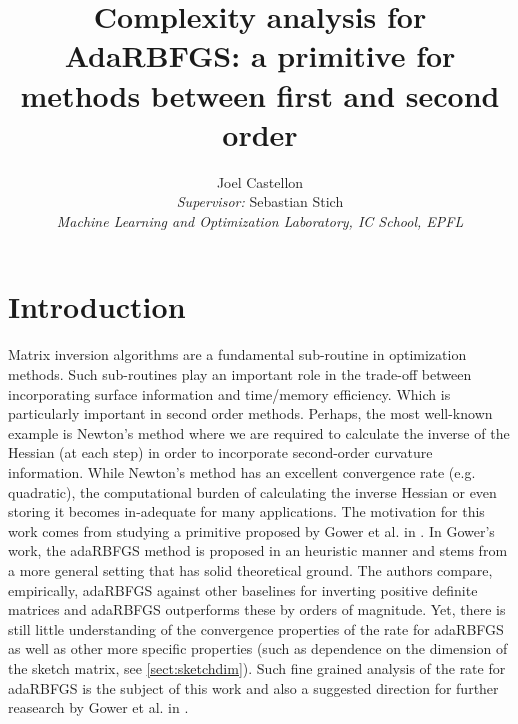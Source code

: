 \documentclass[12pt,conference,compsocconf]{IEEEtran}
\begin{document}
\renewcommand{\arraystretch}{1.2}

\title{Complexity analysis for AdaRBFGS: a primitive for methods between first and second order}

\author{
  Joel Castellon\\
  \textit{Supervisor:} Sebastian Stich\\
  \vspace{4mm}
  \textit{Machine Learning and Optimization Laboratory, IC School, EPFL}\\
}


\maketitle

\section{Introduction}
Matrix inversion algorithms are a fundamental sub-routine in optimization methods. Such sub-routines play an important role in the trade-off between incorporating surface information and time/memory efficiency. Which is particularly important in second order methods. Perhaps, the most well-known example is Newton's method where we are required to calculate the inverse of the Hessian (at each step) in order to incorporate second-order curvature information. While Newton's method has an excellent convergence rate (e.g. quadratic), the computational burden of calculating the inverse Hessian or even storing it becomes in-adequate for many applications.
The motivation for this work comes from studying a primitive proposed by Gower et al. in \cite{Gower1}. In Gower's work, the adaRBFGS method is proposed in an heuristic manner and stems from a more general setting that has solid theoretical ground. The authors compare, empirically, adaRBFGS against other baselines for inverting positive definite matrices and adaRBFGS outperforms these by orders of magnitude. Yet, there is still little understanding of the convergence properties of the rate for adaRBFGS as well as other more specific properties (such as dependence on the dimension of the sketch matrix, see \ref{sect:sketchdim}). Such fine grained analysis of the rate for adaRBFGS is the subject of this work and also a suggested direction for further reasearch by Gower et al. in \cite{Gower1}.
\end{document}
